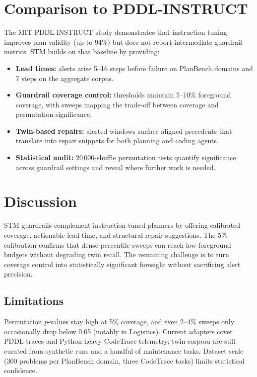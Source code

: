 \documentclass[11pt]{article}
\begin{document}
\section{Comparison to PDDL-INSTRUCT}
The MIT PDDL-INSTRUCT study \cite{verma2025pddlinstruct} demonstrates that
instruction tuning improves plan validity (up to 94\%) but does not report
intermediate guardrail metrics. STM builds on that baseline by providing:
\begin{itemize}
  \item \textbf{Lead times:} alerts arise 5--16 steps before failure on PlanBench
  domains and 7 steps on the aggregate corpus.
  \item \textbf{Guardrail coverage control:} thresholds maintain 5--10\% foreground
  coverage, with sweeps mapping the trade-off between coverage and permutation
  significance.
  \item \textbf{Twin-based repairs:} alerted windows surface aligned precedents
  that translate into repair snippets for both planning and coding agents.
  \item \textbf{Statistical audit:} 20\,000-shuffle permutation tests quantify
  significance across guardrail settings and reveal where further work is needed.
\end{itemize}

\section{Discussion}
STM guardrails complement instruction-tuned planners by offering calibrated
coverage, actionable lead-time, and structural repair suggestions. The $5\%$
calibration confirms that dense percentile sweeps can reach low foreground
budgets without degrading twin recall. The remaining challenge is to turn
coverage control into statistically significant foresight without sacrificing
alert precision.

\subsection{Limitations}
Permutation $p$-values stay high at 5\% coverage, and even 2--4\% sweeps only
occasionally drop below 0.05 (notably in Logistics). Current adapters cover
PDDL traces and Python-heavy CodeTrace telemetry; twin corpora are still
curated from synthetic runs and a handful of maintenance tasks. Dataset scale
(300 problems per PlanBench domain, three CodeTrace tasks) limits statistical
confidence.
\end{document}

